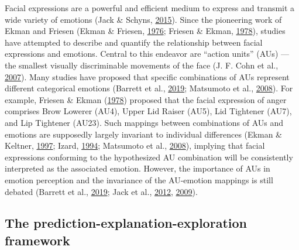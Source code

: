 \documentclass[11pt,american,a4paper,oneside,]{memoir} %
\begin{document}
Facial expressions are a powerful and efficient medium to express and transmit a wide variety of emotions (Jack \& Schyns, \protect\hyperlink{ref-Jack2015-sh}{2015}). Since the pioneering work of Ekman and Friesen (Ekman \& Friesen, \protect\hyperlink{ref-Ekman1976-hm}{1976}; Friesen \& Ekman, \protect\hyperlink{ref-Friesen1978-tp}{1978}), studies have attempted to describe and quantify the relationship between facial expressions and emotions. Central to this endeavor are ``action units'' (AUs) --- the smallest visually discriminable movements of the face (J. F. Cohn et al., \protect\hyperlink{ref-Cohn2007-az}{2007}). Many studies have proposed that specific combinations of AUs represent different categorical emotions (Barrett et al., \protect\hyperlink{ref-Barrett2019-bc}{2019}; Matsumoto et al., \protect\hyperlink{ref-Matsumoto2008-qk}{2008}). For example, Friesen \& Ekman (\protect\hyperlink{ref-Friesen1978-tp}{1978}) proposed that the facial expression of anger comprises Brow Lowerer (AU4), Upper Lid Raiser (AU5), Lid Tightener (AU7), and Lip Tightener (AU23). Such mappings between combinations of AUs and emotions are supposedly largely invariant to individual differences (Ekman \& Keltner, \protect\hyperlink{ref-Ekman1997-bk}{1997}; Izard, \protect\hyperlink{ref-Izard1994-ca}{1994}; Matsumoto et al., \protect\hyperlink{ref-Matsumoto2008-qk}{2008}), implying that facial expressions conforming to the hypothesized AU combination will be consistently interpreted as the associated emotion. However, the importance of AUs in emotion perception and the invariance of the AU-emotion mappings is still debated (Barrett et al., \protect\hyperlink{ref-Barrett2019-bc}{2019}; Jack et al., \protect\hyperlink{ref-Jack2012-eq}{2012}, \protect\hyperlink{ref-Jack2009-yy}{2009}).

\hypertarget{the-prediction-explanation-exploration-framework}{%
\subsection{The prediction-explanation-exploration framework}\label{the-prediction-explanation-exploration-framework}}
\end{document}
